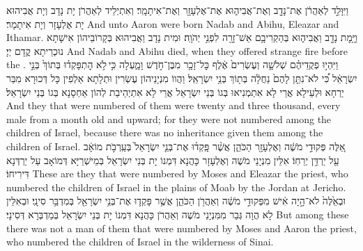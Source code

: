 {וַיִּוָּלֵ֣ד לְאַהֲרֹ֔ן אֶת־נָדָ֖ב וְאֶת־אֲבִיה֑וּא אֶת־אֶלְעָזָ֖ר וְאֶת־אִיתָמָֽר׃}
{וְאִתְיְלֵיד לְאַהֲרֹן יָת נָדָב וְיָת אֲבִיהוּא יָת אֶלְעָזָר וְיָת אִיתָמָר׃}
{And unto Aaron were born Nadab and Abihu, Eleazar and Ithamar.}{}
{וַיָּ֥מׇת נָדָ֖ב וַאֲבִיה֑וּא בְּהַקְרִיבָ֥ם אֵשׁ־זָרָ֖ה לִפְנֵ֥י יְהֹוָֽה׃}
{וּמִית נָדָב וַאֲבִיהוּא בְּקָרוֹבֵיהוֹן אִישָׁתָא נוּכְרֵיתָא קֳדָם יְיָ׃}
{And Nadab and Abihu died, when they offered strange fire before the \lord.}{}
{וַיִּהְי֣וּ פְקֻדֵיהֶ֗ם שְׁלֹשָׁ֤ה וְעֶשְׂרִים֙ אֶ֔לֶף כׇּל־זָכָ֖ר מִבֶּן־חֹ֣דֶשׁ וָמָ֑עְלָה כִּ֣י \legarmeh  לֹ֣א הׇתְפָּקְד֗וּ בְּתוֹךְ֙ בְּנֵ֣י יִשְׂרָאֵ֔ל כִּ֠י לֹא־נִתַּ֤ן לָהֶם֙ נַחֲלָ֔ה בְּת֖וֹךְ בְּנֵ֥י יִשְׂרָאֵֽל׃
}
{וַהֲווֹ מִנְיָנֵיהוֹן עֶשְׂרִין וּתְלָתָא אַלְפִין כָּל דְּכוּרָא מִבַּר יַרְחָא וּלְעֵילָא אֲרֵי לָא אִתְמְנִיאוּ בְּגוֹ בְּנֵי יִשְׂרָאֵל אֲרֵי לָא אִתְיְהֵיבַת לְהוֹן אַחְסָנָא בְּגוֹ בְּנֵי יִשְׂרָאֵל׃}
{And they that were numbered of them were twenty and three thousand, every male from a month old and upward; for they were not numbered among the children of Israel, because there was no inheritance given them among the children of Israel.}{}
{אֵ֚לֶּה פְּקוּדֵ֣י מֹשֶׁ֔ה וְאֶלְעָזָ֖ר הַכֹּהֵ֑ן אֲשֶׁ֨ר פָּֽקְד֜וּ אֶת־בְּנֵ֤י יִשְׂרָאֵל֙ בְּעַֽרְבֹ֣ת מוֹאָ֔ב עַ֖ל יַרְדֵּ֥ן יְרֵחֽוֹ׃}
{אִלֵּין מִנְיָנֵי מֹשֶׁה וְאֶלְעָזָר כָּהֲנָא דִּמְנוֹ יָת בְּנֵי יִשְׂרָאֵל בְּמֵישְׁרַיָּא דְּמוֹאָב עַל יַרְדְּנָא דִּירִיחוֹ׃}
{These are they that were numbered by Moses and Eleazar the priest, who numbered the children of Israel in the plains of Moab by the Jordan at Jericho.}{}
{וּבְאֵ֙לֶּה֙ לֹא־הָ֣יָה אִ֔ישׁ מִפְּקוּדֵ֣י מֹשֶׁ֔ה וְאַהֲרֹ֖ן הַכֹּהֵ֑ן אֲשֶׁ֥ר פָּקְד֛וּ אֶת־בְּנֵ֥י יִשְׂרָאֵ֖ל בְּמִדְבַּ֥ר סִינָֽי׃
}
{וּבְאִלֵּין לָא הֲוָה גְּבַר מִמִּנְיָנֵי מֹשֶׁה וְאַהֲרֹן כָּהֲנָא דִּמְנוֹ יָת בְּנֵי יִשְׂרָאֵל בְּמַדְבְּרָא דְּסִינָי׃}
{But among these there was not a man of them that were numbered by Moses and Aaron the priest, who numbered the children of Israel in the wilderness of Sinai.}{}

